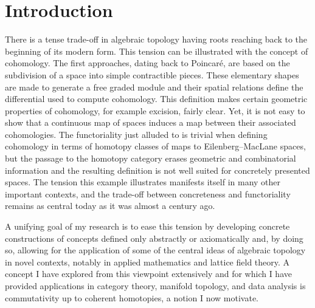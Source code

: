 
\section{Introduction} \label{s:introduction}

There is a tense trade-off in algebraic topology having roots reaching back to the beginning of its modern form.
This tension can be illustrated with the concept of cohomology.
The first approaches, dating back to Poincar\'e, are based on the subdivision of a space into simple contractible pieces.
These elementary shapes are made to generate a free graded module and their spatial relations define the differential used to compute cohomology.
This definition makes certain geometric properties of cohomology, for example excision, fairly clear.
Yet, it is not easy to show that a continuous map of spaces induces a map between their associated cohomologies.
The functoriality just alluded to is trivial when defining cohomology in terms of homotopy classes of maps to Eilenberg--MacLane spaces, but the passage to the homotopy category erases geometric and combinatorial information and the resulting definition is not well suited for concretely presented spaces.
The tension this example illustrates manifests itself in many other important contexts, and the trade-off between concreteness and functoriality remains as central today as it was almost a century ago.

A unifying goal of my research is to ease this tension by developing concrete constructions of concepts defined only abstractly or axiomatically and, by doing so, allowing for the application of some of the central ideas of algebraic topology in novel contexts, notably in applied mathematics and lattice field theory.
A concept I have explored from this viewpoint extensively and for which I have provided applications in category theory, manifold topology, and data analysis is commutativity up to coherent homotopies, a notion I now motivate.

